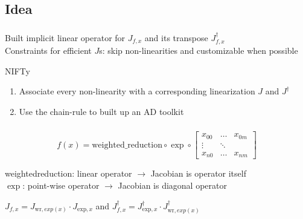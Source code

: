 \documentclass[aspectratio=169,xcolor=dvipsnames]{beamer}
\begin{document}
\subsection{Idea}
\begin{frame}
	\frametitle{\insertsection}
	\framesubtitle{\insertsubsection}

	Built implicit linear operator for $J_{f,x}$ and its transpose $J_{f,x}^\dagger$
	\vspace{1em}
	\\ Constraints for efficient $J$s: skip non-linearities and customizable when possible

	\vspace{3em}
	NIFTy
	\begin{enumerate}
		\item Associate every non-linearity with a corresponding linearization $J$ and $J^\dagger$
		\item Use the chain-rule to built up an AD toolkit
	\end{enumerate}

\end{frame}

\begin{frame}
	\frametitle{\insertsection}
	\framesubtitle{\insertsubsection}

	\begin{equation*}
		f(x) =
		\text{weighted\_reduction}
		\circ
		\exp
		\circ
		\begin{bmatrix}
			x_{00} & \dots & x_{0m} \\
			\vdots & \ddots & \\
			x_{n0} & \dots & x_{nm}
		\end{bmatrix}
	\end{equation*}

	\vspace{1em}
	weighted\textunderscore{}reduction: linear operator $\rightarrow$ Jacobian is operator itself
	\\ $\exp$: point-wise operator $\rightarrow$ Jacobian is diagonal operator

	\vspace{2em}
	\begin{center}
		$J_{f,x} = J_{\text{wr},exp(x)} \cdot J_{\text{exp},x}$
		\hspace{2em}
		and
		\hspace{2em}
		$J_{f,x}^\dagger = J_{\text{exp},x}^\dagger \cdot J_{\text{wr},exp(x)}^\dagger$
	\end{center}

\end{frame}
\end{document}
